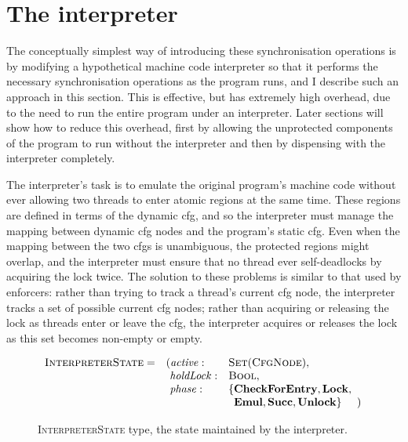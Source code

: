 \section{The interpreter}

The conceptually simplest way of introducing these synchronisation
operations is by modifying a hypothetical machine code interpreter so
that it performs the necessary synchronisation operations as the
program runs, and I describe such an approach in this section.  This
is effective, but has extremely high overhead, due to the need to run
the entire program under an interpreter.  Later sections will show how
to reduce this overhead, first by allowing the unprotected components
of the program to run without the interpreter and then by dispensing
with the interpreter completely.

 The interpreter's task is to emulate the original
program's machine code without ever allowing two threads to enter
atomic regions at the same time.  These regions are defined in terms
of the dynamic \gls{cfg}, and so the interpreter must manage the
mapping between dynamic \gls{cfg} nodes and the program's static
\gls{cfg}.  Even when the mapping between the two \glspl{cfg} is
unambiguous, the protected regions might overlap, and the interpreter
must ensure that no thread ever self-deadlocks by acquiring the lock
twice.  The solution to these problems is similar to that used by
enforcers: rather than trying to track a thread's current \gls{cfg}
node, the interpreter tracks a set of possible current \gls{cfg}
nodes; rather than acquiring or releasing the lock as threads enter or
leave the \gls{cfg}, the interpreter acquires or releases the lock as
this set becomes non-empty or empty.

\begin{figure}
  \begin{displaymath}
    \begin{array}{llll}
      \textsc{InterpreterState} = & (\mathit{active}: &\textsc{Set}(\textsc{CfgNode}), &\\
      & \,\,\mathit{holdLock}: &\textsc{Bool},\\
      & \,\,\mathit{phase}: & \{\mathbf{CheckForEntry}, \mathbf{Lock}, \\
      &                     & \,\,\,\mathbf{Emul}, \mathbf{Succ}, \mathbf{Unlock}\} &\!\!\!)\\
    \end{array}
  \end{displaymath}
  \caption{\textsc{InterpreterState} type, the state maintained by the
    interpreter.}
  \label{fig:fix_bugs:interpreter_state}
\end{figure}


